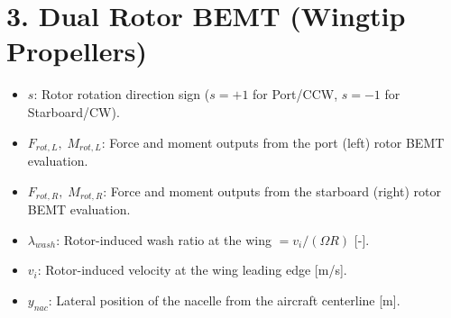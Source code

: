\documentclass{article}
\begin{document}
\section*{3. Dual Rotor BEMT (Wingtip Propellers)}
\begin{itemize}
    \item $s$: Rotor rotation direction sign ($s = +1$ for Port/CCW, $s = -1$ for Starboard/CW).
    \item $F_{rot,L},\; M_{rot,L}$: Force and moment outputs from the port (left) rotor BEMT evaluation.
    \item $F_{rot,R},\; M_{rot,R}$: Force and moment outputs from the starboard (right) rotor BEMT evaluation.
    \item $\lambda_{wash}$: Rotor-induced wash ratio at the wing $= v_i / (\Omega R)$ [-].
    \item $v_i$: Rotor-induced velocity at the wing leading edge [m/s].
    \item $y_{nac}$: Lateral position of the nacelle from the aircraft centerline [m].
\end{itemize}
\end{document}
